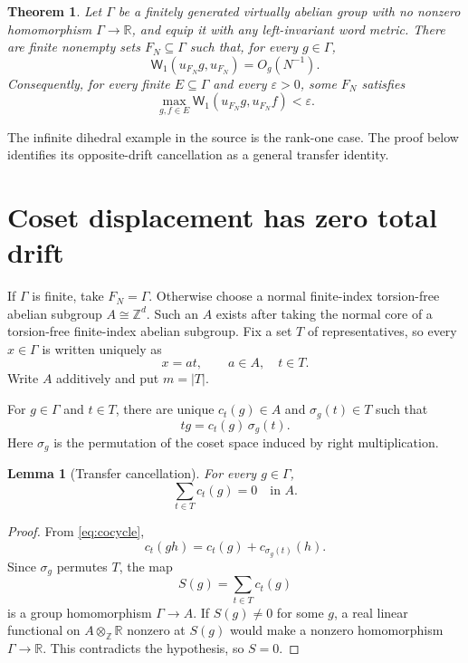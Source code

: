 \documentclass[11pt]{article}
\newtheorem{theorem}{Theorem}
\newtheorem{lemma}{Lemma}
\newcommand{\R}{\mathbb R}
\newcommand{\Z}{\mathbb Z}
\newcommand{\G}{\Gamma}
\newcommand{\W}{\mathsf W_1}
\begin{document}
\begin{theorem}\label{thm:main}
Let $\G$ be a finitely generated virtually abelian group with no nonzero
homomorphism $\G\to\R$, and equip it with any left-invariant word metric.
There are finite nonempty sets $F_N\subseteq\G$ such that, for every
$g\in\G$,
\[
                            \W(u_{F_N}g,u_{F_N})=O_g(N^{-1}).
                            \tag{2}\label{eq:rate}
\]
Consequently, for every finite $E\subseteq\G$ and every $\varepsilon>0$, some
$F_N$ satisfies
\[
                    \max_{g,f\in E}\W(u_{F_N}g,u_{F_N}f)<\varepsilon.
\]
\end{theorem}

The infinite dihedral example in the source is the rank-one case.  The proof
below identifies its opposite-drift cancellation as a general transfer
identity.

\section{Coset displacement has zero total drift}

If $\G$ is finite, take $F_N=\G$.  Otherwise choose a normal finite-index
torsion-free abelian subgroup $A\cong\Z^d$.  Such an $A$ exists after taking
the normal core of a torsion-free finite-index abelian subgroup.  Fix a set
$T$ of representatives, so every $x\in\G$ is written uniquely as
\[
                               x=a t,\qquad a\in A,\quad t\in T.
\]
Write $A$ additively and put $m=|T|$.

For $g\in\G$ and $t\in T$, there are unique
$c_t(g)\in A$ and $\sigma_g(t)\in T$ such that
\begin{equation}\label{eq:cocycle}
                         t g=c_t(g)\,\sigma_g(t).
\end{equation}
Here $\sigma_g$ is the permutation of the coset space induced by right
multiplication.

\begin{lemma}[Transfer cancellation]\label{lem:transfer}
For every $g\in\G$,
\[
                              \sum_{t\in T}c_t(g)=0\quad\text{in }A.
\]
\end{lemma}

\begin{proof}
From \eqref{eq:cocycle},
\[
 c_t(gh)=c_t(g)+c_{\sigma_g(t)}(h).
\]
Since $\sigma_g$ permutes $T$, the map
\[
                         S(g)=\sum_{t\in T}c_t(g)
\]
is a group homomorphism $\G\to A$.  If $S(g)\neq0$ for some $g$, a real
linear functional on $A\otimes_{\Z}\R$ nonzero at $S(g)$ would make a
nonzero homomorphism $\G\to\R$.  This contradicts the hypothesis, so $S=0$.
\end{proof}
\end{document}
